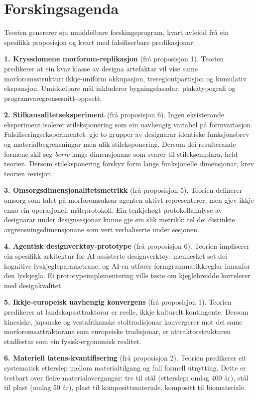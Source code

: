 \section{Forskingsagenda}
\label{sec:agenda-nn}

Teorien genererer sju umiddelbare forskingsprogram, kvart avleidd frå ein spesifikk proposisjon og kvart med falsifiserbare predikasjonar.

\textbf{1. Kryssdomene morforom-replikasjon} (frå proposisjon 1). Teorien predikerer at ein kvar klasse av designa artefaktar vil vise same morforomsstruktur: ikkje-uniform okkupasjon, treregiontpartisjon og kumulativ ekspansjon. Umiddelbare mål inkluderer bygningsfasadar, plakatypografi og programvaregrensesnitt-oppsett.

\textbf{2. Stilkausalitetseksperiment} (frå proposisjon 6). Ingen eksisterande eksperiment isolerer stileksponering som ein uavhengig variabel på formvariasjon. Falsifiseringseksperimentet: gje to grupper av designarar identiske funksjonsbrev og materialbegrensningar men ulik stileksponering. Dersom dei resulterande formene skil seg \textit{berre} langs dimensjonane som svarer til stileksemplara, held teorien. Dersom stileksponering forskyv form langs funksjonelle dimensjonar, krev teorien revisjon.

\textbf{3. Omsorgsdimensjonalitetsmetrikk} (frå proposisjon 5). Teorien definerer omsorg som talet på morforomsaksar agenten aktivt representerer, men gjev ikkje enno ein operasjonell måleprotokoll. Ein tenkjehøgt-protokollanalyse av designarar under designsesjonar kunne gje ein slik metrikk: tel dei distinkte avgrensningsdimensjonane som vert verbaliserte under sesjonen.

\textbf{4. Agentisk designverktøy-prototype} (frå proposisjon 6). Teorien impliserer ein spesifikk arkitektur for AI-assisterte designverktøy: mennesket set dei kognitive lyskjegleparametrane, og AI-en utfører formgrammatikkreglar innanfor den lyskjegla. Ei prototypeimplementering ville teste om kjeglebreidde korrelerer med designkvalitet.

\textbf{5. Ikkje-europeisk uavhengig konvergens} (frå proposisjon 1). Teorien predikerer at landskapsattraktorar er reelle, ikkje kulturelt kontingente. Dersom kinesiske, japanske og vestafrikanske stoltradisjonar konvergerer mot dei same morforomsattraktorane som europeiske tradisjonar, er attraktorstrukturen stadfestar som ein fysisk-ergonomisk realitet.

\textbf{6. Materiell latens-kvantifisering} (frå proposisjon 2). Teorien predikerer eit systematisk etterslep mellom materialtilgang og full formell utnytting. Dette er testbart over fleire materialovergangar: tre til stål (etterslep: omlag 400 år), stål til plast (omlag 50 år), plast til komposittmateriale, kompositt til biomateriale.

